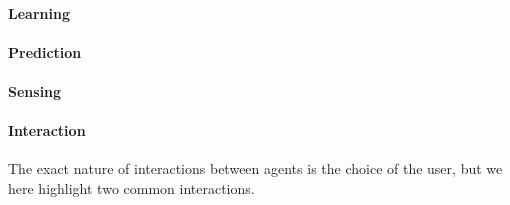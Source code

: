 \documentclass[10pt,letterpaper]{article}
\begin{document}
\paragraph{Learning}

\paragraph{Prediction}

\paragraph{Sensing}

\paragraph{Interaction}
The exact nature of interactions between agents is the choice of the user, but we here highlight two common interactions.
\end{document}
